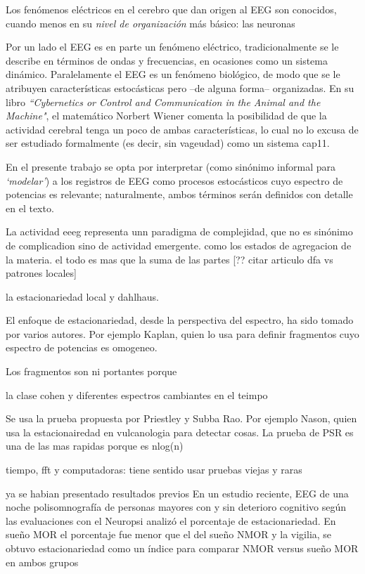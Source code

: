 \documentclass[12pt,letterpaper,draft]{book}
\begin{document}
Los fenómenos eléctricos en el cerebro que dan origen al EEG son conocidos, cuando menos en su \textit{nivel de organización} más básico: las neuronas
%


Por un lado el EEG es en parte un fenómeno eléctrico, tradicionalmente se le describe en términos de ondas y frecuencias, en ocasiones como un sistema dinámico.
%
Paralelamente el EEG es un fenómeno biológico, de modo que se le atribuyen características estocásticas pero --de alguna forma-- organizadas.
%
En su libro \textit{``Cybernetics or Control and Communication in the Animal and the Machine"}, el matemático Norbert Wiener comenta la posibilidad de que la actividad cerebral tenga un poco de ambas características, lo cual no lo excusa de ser estudiado formalmente (es decir, sin vageudad) como un sistema \cite{wiener61} cap11.

En el presente trabajo se opta por interpretar (como sinónimo informal para \textit{`modelar'}) a los registros de EEG como procesos estocásticos cuyo espectro de potencias es relevante; naturalmente, ambos términos serán definidos con detalle en el texto.

La actividad eeeg representa unn paradigma de complejidad, que no es sinónimo de complicadion sino de actividad emergente.
como los estados de agregacion de la materia.
el todo es mas que la suma de las partes
[?? citar articulo dfa vs patrones locales]

la estacionariedad local y dahlhaus.

El enfoque de estacionariedad, desde la perspectiva del espectro, ha sido tomado por varios autores. Por ejemplo Kaplan, quien lo usa para definir fragmentos cuyo espectro de potencias es omogeneo. 

Los fragmentos son ni portantes porque

la clase cohen y diferentes espectros cambiantes en el teimpo

Se usa la prueba propuesta por Priestley y Subba Rao.
Por ejemplo Nason, quien usa la estacionairedad en vulcanologia para detectar cosas. La prueba de PSR es una de las mas rapidas porque es nlog(n)

tiempo, fft y computadoras: tiene sentido usar pruebas viejas y raras

ya se habian presentado resultados previos
En un estudio reciente, EEG de una noche polisomnografía de personas mayores con y sin deterioro cognitivo según las evaluaciones con el Neuropsi analizó el porcentaje de estacionariedad.  En sueño MOR el porcentaje fue menor que el del sueño NMOR y la vigilia, se obtuvo estacionariedad  como un índice para comparar NMOR versus sueño MOR en ambos grupos %
\end{document}
